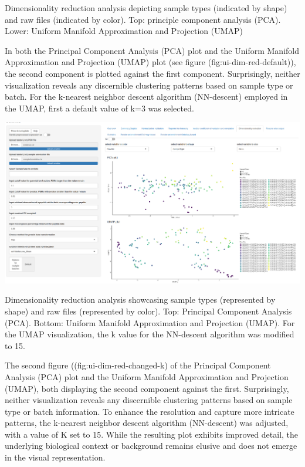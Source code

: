 \documentclass[
  11pt,
]{article}
\let\origfigure\figure
\begin{document}
\caption{Dimensionality reduction analysis depicting sample types (indicated by shape) and raw files (indicated by color). Top: principle component analysis (PCA). Lower: Uniform Manifold Approximation and Projection (UMAP)}\label{fig:ui-dim-red-default}
 \endfigure\egroup

In both the Principal Component Analysis (PCA) plot and the Uniform Manifold Approximation and Projection (UMAP) plot (see figure (fig:ui-dim-red-default)), the second component is plotted against the first component. Surprisingly, neither visualization reveals any discernible clustering patterns based on sample type or batch. For the k-nearest neighbor descent algorithm (NN-descent) employed in the UMAP, first a default value of k=3 was selected.

\newpage
\bgroup  \origfigure[H] 

{\centering \includegraphics[width=1\linewidth]{screenshots/dim_red_changed_k} 

}

\caption{Dimensionality reduction analysis showcasing sample types (represented by shape) and raw files (represented by color). Top: Principal Component Analysis (PCA). Bottom: Uniform Manifold Approximation and Projection (UMAP). For the UMAP visualization, the k value for the NN-descent algorithm was modified to 15.}\label{fig:ui-dim-red-changed-k}
 \endfigure\egroup

The second figure ((fig:ui-dim-red-changed-k) of the Principal Component Analysis (PCA) plot and the Uniform Manifold Approximation and Projection (UMAP), both displaying the second component against the first. Surprisingly, neither visualization reveals any discernible clustering patterns based on sample type or batch information. To enhance the resolution and capture more intricate patterns, the k-nearest neighbor descent algorithm (NN-descent) was adjusted, with a value of K set to 15. While the resulting plot exhibits improved detail, the underlying biological context or background remains elusive and does not emerge in the visual representation.
\end{document}

